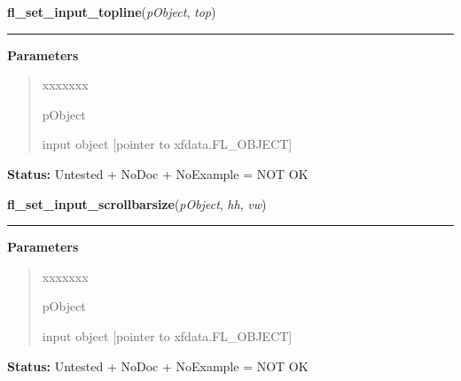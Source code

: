 \hspace{.8\funcindent}\begin{boxedminipage}{\funcwidth}

    \raggedright \textbf{fl\_set\_input\_topline}(\textit{pObject}, \textit{top})

    \vspace{-1.5ex}

    \rule{\textwidth}{0.5\fboxrule}
\setlength{\parskip}{2ex}
\setlength{\parskip}{1ex}
      \textbf{Parameters}
      \vspace{-1ex}

      \begin{quote}
        \begin{Ventry}{xxxxxxx}

          \item[pObject]

          input object [pointer to xfdata.FL\_OBJECT]

        \end{Ventry}

      \end{quote}

\textbf{Status:} Untested + NoDoc + NoExample = NOT OK



    \end{boxedminipage}

    \label{xformslib:library:fl_set_input_scrollbarsize}

    \vspace{0.5ex}

\hspace{.8\funcindent}\begin{boxedminipage}{\funcwidth}

    \raggedright \textbf{fl\_set\_input\_scrollbarsize}(\textit{pObject}, \textit{hh}, \textit{vw})

    \vspace{-1.5ex}

    \rule{\textwidth}{0.5\fboxrule}
\setlength{\parskip}{2ex}
\setlength{\parskip}{1ex}
      \textbf{Parameters}
      \vspace{-1ex}

      \begin{quote}
        \begin{Ventry}{xxxxxxx}

          \item[pObject]

          input object [pointer to xfdata.FL\_OBJECT]

        \end{Ventry}

      \end{quote}

\textbf{Status:} Untested + NoDoc + NoExample = NOT OK



    \end{boxedminipage}

